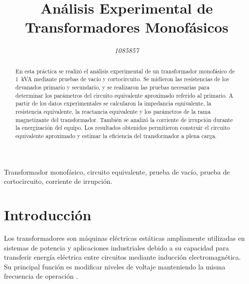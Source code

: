 \documentclass[conference]{IEEEtran}
\begin{document}
\title{Análisis Experimental de Transformadores Monofásicos}

\author{
    \textit{1085857}
}

\maketitle

\begin{abstract}
En esta práctica se realizó el análisis experimental de un transformador monofásico de 1~kVA mediante pruebas de vacío y cortocircuito. Se midieron las resistencias de los devanados primario y secundario, y se realizaron las pruebas necesarias para determinar los parámetros del circuito equivalente aproximado referido al primario. A partir de los datos experimentales se calcularon la impedancia equivalente, la resistencia equivalente, la reactancia equivalente y los parámetros de la rama magnetizante del transformador. También se analizó la corriente de irrupción durante la energización del equipo. Los resultados obtenidos permitieron construir el circuito equivalente aproximado y estimar la eficiencia del transformador a plena carga.
\end{abstract}

\begin{IEEEkeywords}
Transformador monofásico, circuito equivalente, prueba de vacío, prueba de cortocircuito, corriente de irrupción.
\end{IEEEkeywords}

\section{Introducción}

Los transformadores son máquinas eléctricas estáticas ampliamente utilizadas en sistemas de potencia y aplicaciones industriales debido a su capacidad para transferir energía eléctrica entre circuitos mediante inducción electromagnética. Su principal función es modificar niveles de voltaje manteniendo la misma frecuencia de operación \cite{chapman}.
\end{document}
